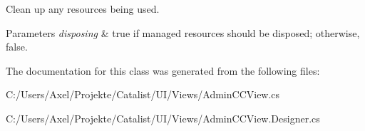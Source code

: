 Clean up any resources being used. 


\begin{DoxyParams}{Parameters}
{\em disposing} & true if managed resources should be disposed; otherwise, false.\\
\hline
\end{DoxyParams}


The documentation for this class was generated from the following files\+:\begin{DoxyCompactItemize}
\item 
C\+:/\+Users/\+Axel/\+Projekte/\+Catalist/\+U\+I/\+Views/Admin\+C\+C\+View.\+cs\item 
C\+:/\+Users/\+Axel/\+Projekte/\+Catalist/\+U\+I/\+Views/Admin\+C\+C\+View.\+Designer.\+cs\end{DoxyCompactItemize}
